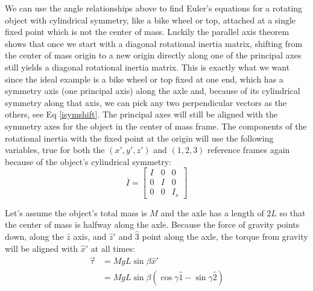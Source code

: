 \documentclass[10pt]{article}
\begin{document}
We can use the angle relationships above to find Euler's equations for a 
rotating object with cylindrical symmetry, like a bike wheel or top,
 attached at a single fixed point which is not the center 
of mass. Luckily the parallel axis theorem shows that once we start with 
a diagonal rotational inertia matrix, shifting from 
the center of mass origin to a new origin directly 
along one of the principal axes still 
yields a diagonal rotational inertia matrix. This is exactly what we want 
since the ideal example is a bike wheel or top fixed at one end, which 
has a symmetry axis (one principal axis) along the axle and, because of 
its cylindrical symmetry along that axis, we can pick any two 
perpendicular vectors as the others, see Eq \ref{isymshift}. The 
principal axes will still be aligned with the symmetry axes for the 
object in the center of mass frame. The components of the 
rotational inertia with the fixed point at the origin will use the following
variables, true for both the $(x',y',z')$ and $(1,2,3)$ reference frames
again because of the object's cylindrical symmetry:
\begin{equation*}
    \overline{I} = 
    \begin{bmatrix}
        I & 0 & 0 \\
        0 & I & 0 \\
        0 & 0 & I_s 
    \end{bmatrix}
\end{equation*}

Let's assume the object's total mass is $M$ and the axle has a length of 
$2L$ so that the center of mass is halfway along the axle.
Because the force of gravity points down, along the $\hat{z}$ axis, 
and $\hat{z}'$ and $\hat{3}$ point along the axle, the torque from 
gravity will be aligned with $\hat{x}'$ at all times:
\begin{align*}
    \vec{\tau} &= MgL\sin\beta\hat{x}' \\
        &= MgL\sin\beta(\cos\gamma\hat{1} -\sin\gamma\hat{2})
\end{align*}
\end{document}
